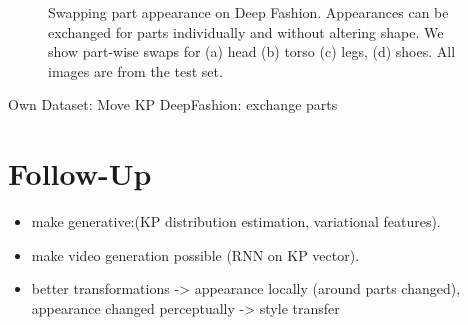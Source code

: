 \begin{figure}[t]
\begin{subfigure}{0.49\linewidth}
		\label{fig:part3_30}
		\end{subfigure}
		\caption{Swapping part appearance on Deep Fashion. Appearances can be exchanged for parts individually and without altering shape. We show part-wise swaps for (a) head (b) torso (c) legs, (d) shoes. All images are from the test set.}
		\label{fig:partswaps}
	\end{figure}
		Own Dataset: Move KP
		DeepFashion: exchange parts
\section{Follow-Up}
	\begin{itemize}
		\item make generative:(KP distribution estimation, variational features).
		\item make video generation possible (RNN on KP vector).
		\item better transformations -> appearance locally (around parts changed), appearance changed perceptually -> style transfer
	\end{itemize}





